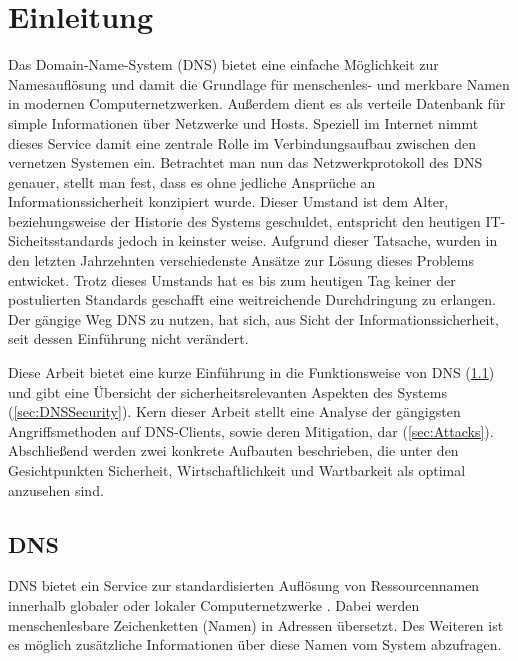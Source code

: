 \chapter{Einleitung}
Das Domain-Name-System (DNS) bietet eine einfache Möglichkeit zur Namesauflösung und damit die Grundlage für menschenles- und merkbare Namen in modernen Computernetzwerken. Außerdem dient es als verteile Datenbank für simple Informationen über Netzwerke und Hosts. Speziell im Internet nimmt dieses Service damit eine zentrale Rolle im Verbindungsaufbau zwischen den vernetzen Systemen ein. Betrachtet man nun das Netzwerkprotokoll des DNS genauer, stellt man fest, dass es ohne jedliche Ansprüche an Informationssicherheit konzipiert wurde. Dieser Umstand ist dem Alter, beziehungsweise der Historie des Systems geschuldet, entspricht den heutigen IT-Sicheitsstandards jedoch in keinster weise. Aufgrund dieser Tatsache, wurden in den letzten Jahrzehnten verschiedenste Ansätze zur Lösung dieses Problems entwicket. Trotz dieses Umstands hat es bis zum heutigen Tag keiner der postulierten Standards geschafft eine weitreichende Durchdringung zu erlangen. Der gängige Weg DNS zu nutzen, hat sich, aus Sicht der Informationssicherheit, seit dessen Einführung nicht verändert.


Diese Arbeit bietet eine kurze Einführung in die Funktionsweise von DNS (\ref{sec:DNS}) und gibt eine Übersicht der sicherheitsrelevanten Aspekten des Systems (\ref{sec:DNSSecurity}). Kern dieser Arbeit stellt eine Analyse der gängigsten Angriffsmethoden auf DNS-Clients, sowie deren Mitigation, dar (\ref{sec:Attacks}). Abschließend werden zwei konkrete Aufbauten beschrieben, die unter den Gesichtpunkten Sicherheit, Wirtschaftlichkeit und Wartbarkeit als optimal anzusehen sind.

\section{DNS}
\label{sec:DNS}

DNS bietet ein Service zur standardisierten Auflösung von Ressourcennamen innerhalb globaler oder lokaler Computernetzwerke \cite{rfc1035}. Dabei werden menschenlesbare Zeichenketten (Namen) in Adressen übersetzt. Des Weiteren ist es möglich zusätzliche Informationen über diese Namen vom System abzufragen.


